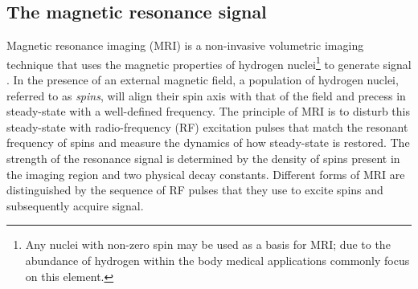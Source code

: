 \subsection{The magnetic resonance signal}

Magnetic resonance imaging (MRI) is a non-invasive volumetric imaging technique that uses the magnetic properties of hydrogen nuclei\footnote{Any nuclei with non-zero spin may be used as a basis for MRI; due to the abundance of hydrogen within the body medical applications commonly focus on this element.} to generate signal \cite{bushberg2011}. In the presence of an external magnetic field, a population of hydrogen nuclei, referred to as \textit{spins}, will align their spin axis with that of the field and precess in steady-state with a well-defined frequency. The principle of MRI is to disturb this steady-state with radio-frequency (RF) excitation pulses that match the resonant frequency of spins and measure the dynamics of how steady-state is restored. The strength of the resonance signal is determined by the density of spins present in the imaging region and two physical decay constants. Different forms of MRI are distinguished by the sequence of RF pulses that they use to excite spins and subsequently acquire signal. 




